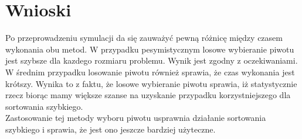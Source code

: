 \documentclass[10pt,oneside]{mwbk}
\begin{document}
\section {Wnioski}
\indent Po przeprowadzeniu symulacji da się zauważyć pewną różnicę między czasem wykonania obu metod.
W przypadku pesymistycznym losowe wybieranie piwotu jest szybsze dla kazdego rozmiaru problemu. Wynik jest zgodny z oczekiwaniami. 
\indent W średnim przypadku losowanie piwotu również sprawia, że czas wykonania jest krótszy. Wynika to z faktu, że losowe wybieranie piwotu sprawia, iż statystycznie rzecz biorąc mamy większe szanse na uzyskanie przypadku korzystniejszego dla sortowania szybkiego. \\
\indent Zastosowanie tej metody wyboru piwotu usprawnia działanie sortowania szybkiego i sprawia, że jest ono jeszcze bardziej użyteczne. 
\end{document}

